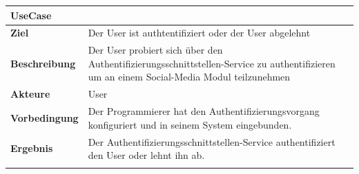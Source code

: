 \begin{longtable}[c]{@{}ll@{}}
\toprule
\begin{minipage}[b]{0.34\columnwidth}\raggedright\strut
\textbf{UseCase}
\strut\end{minipage} &
\begin{minipage}[b]{0.60\columnwidth}\raggedright\strut
\strut\end{minipage}\tabularnewline
\midrule
\endhead
\begin{minipage}[t]{0.34\columnwidth}\raggedright\strut
\textbf{Ziel}
\strut\end{minipage} &
\begin{minipage}[t]{0.60\columnwidth}\raggedright\strut
Der User ist authtentifiziert oder der User abgelehnt
\strut\end{minipage}\tabularnewline
\begin{minipage}[t]{0.34\columnwidth}\raggedright\strut
\textbf{Beschreibung}
\strut\end{minipage} &
\begin{minipage}[t]{0.60\columnwidth}\raggedright\strut
Der User probiert sich über den Authentifizierungsschnittstellen-Service
zu authentifizieren um an einem Social-Media Modul teilzunehmen
\strut\end{minipage}\tabularnewline
\begin{minipage}[t]{0.34\columnwidth}\raggedright\strut
\textbf{Akteure}
\strut\end{minipage} &
\begin{minipage}[t]{0.60\columnwidth}\raggedright\strut
User
\strut\end{minipage}\tabularnewline
\begin{minipage}[t]{0.34\columnwidth}\raggedright\strut
\textbf{Vorbedingung}
\strut\end{minipage} &
\begin{minipage}[t]{0.60\columnwidth}\raggedright\strut
Der Programmierer hat den Authentifizierungsvorgang konfiguriert und in
seinem System eingebunden.
\strut\end{minipage}\tabularnewline
\begin{minipage}[t]{0.34\columnwidth}\raggedright\strut
\textbf{Ergebnis}
\strut\end{minipage} &
\begin{minipage}[t]{0.60\columnwidth}\raggedright\strut
Der Authentifizierungsschnittstellen-Service authentifiziert den User
oder lehnt ihn ab.
\strut\end{minipage}\tabularnewline
\begin{minipage}[t]{0.34\columnwidth}\raggedright\strut

\end{minipage}
\end{longtable}
